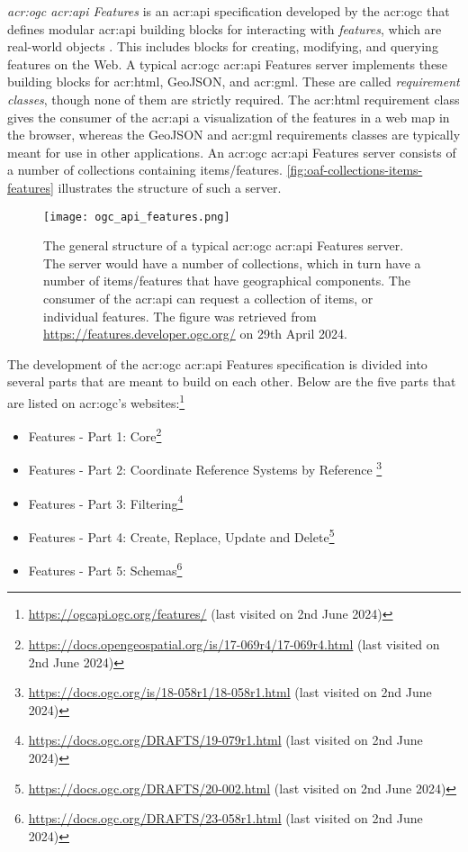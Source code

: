 \textit{\acrshort{acr:ogc} \acrshort{acr:api} Features} is an \acrshort{acr:api} specification developed by the \acrfull{acr:ogc} that defines modular \acrshort{acr:api} building blocks for interacting with \textit{features}, which are real-world objects \citep{opengeospatialconsortiumOGCAPIFeatures2022}. This includes blocks for creating, modifying, and querying features on the Web. A typical \acrshort{acr:ogc} \acrshort{acr:api} Features server implements these building blocks for \acrshort{acr:html}, GeoJSON, and \acrshort{acr:gml}. These are called \textit{requirement classes}, though none of them are strictly required. The \acrshort{acr:html} requirement class gives the consumer of the \acrshort{acr:api} a visualization of the features in a web map in the browser, whereas the GeoJSON and \acrshort{acr:gml} requirements classes are typically meant for use in other applications. An \acrshort{acr:ogc} \acrshort{acr:api} Features server consists of a number of collections containing items/features. \autoref{fig:oaf-collections-items-features} illustrates the structure of such a server.

\begin{figure}[h]
    \centering
    \texttt{[image: ogc\_api\_features.png]}
    \caption[The general structure of a typical OGC API Features server]{The general structure of a typical \acrshort{acr:ogc} \acrshort{acr:api} Features server. The server would have a number of collections, which in turn have a number of items/features that have geographical components. The consumer of the \acrshort{acr:api} can request a collection of items, or individual features. The figure was retrieved from \url{https://features.developer.ogc.org/} on 29th April 2024.}
    \label{fig:oaf-collections-items-features}
\end{figure}

The development of the \acrshort{acr:ogc} \acrshort{acr:api} Features specification is divided into several parts that are meant to build on each other. Below are the five parts that are listed on \acrshort{acr:ogc}'s websites:\footnote{\url{https://ogcapi.ogc.org/features/} (last visited on 2nd June 2024)}

\begin{itemize}
    \item Features - Part 1: Core\footnote{\url{https://docs.opengeospatial.org/is/17-069r4/17-069r4.html} (last visited on 2nd June 2024)}
    \item Features - Part 2: Coordinate Reference Systems by Reference \footnote{\url{https://docs.ogc.org/is/18-058r1/18-058r1.html} (last visited on 2nd June 2024)}
    \item Features - Part 3: Filtering\footnote{\url{https://docs.ogc.org/DRAFTS/19-079r1.html} (last visited on 2nd June 2024)}
    \item Features - Part 4: Create, Replace, Update and Delete\footnote{\url{https://docs.ogc.org/DRAFTS/20-002.html} (last visited on 2nd June 2024)}
    \item Features - Part 5: Schemas\footnote{\url{https://docs.ogc.org/DRAFTS/23-058r1.html} (last visited on 2nd June 2024)}
\end{itemize}

